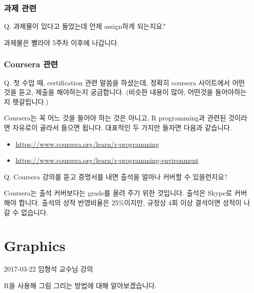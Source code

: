 \documentclass[11pt,]{krantz}
\providecommand{\tightlist}{%
  \setlength{\itemsep}{0pt}\setlength{\parskip}{0pt}}
\renewenvironment{quote}{\begin{VF}}{\end{VF}}
\theoremstyle{definition}
\theoremstyle{definition}
\theoremstyle{remark}
\begin{document}
\subsection*{과제 관련}\label{-}


\begin{quote}
Q. 과제물이 있다고 들었는데 언제 assign하게 되는지요?
\end{quote}

과제물은 빨라야 5주차 이후에 나갑니다.

\subsection*{Coursera 관련}\label{coursera-}


\begin{quote}
Q. 첫 수업 때, certification 관련 말씀을 하셨는데, 정확히 coursera
사이트에서 어떤 것을 듣고, 제출을 해야하는지 궁금합니다. (비슷한 내용이
많아, 어떤것을 들어야하는지 헷갈립니다.) 
\end{quote}

Coursera는 꼭 어느 것을 들어야 하는 것은 아니고, R programming과 관련된
것이라면 자유로이 골라서 들으면 됩니다. 대표적인 두 가지만 들자면 다음과
같습니다.

\begin{itemize}
\tightlist
\item
  \url{https://www.coursera.org/learn/r-programming}
\item
  \url{https://www.coursera.org/learn/r-programming-environment}
\end{itemize}

\begin{quote}
Q. Coursera 강의를 듣고 증명서를 내면 출석을 얼마나 커버할 수
있을런지요?
\end{quote}

Coursera는 출석 커버보다는 grade를 올려 주기 위한 것입니다. 출석은
Skype로 커버해야 합니다. 출석의 성적 반영비율은 25\%이지만, 규정상 4회
이상 결석이면 성적이 나갈 수 없습니다.

\mainmatter

\chapter{Graphics}\label{graphics}

\begin{quote}
2017-03-22 임형석 교수님 강의
\end{quote}

R을 사용해 그림 그리는 방법에 대해 알아보겠습니다.
\end{document}
